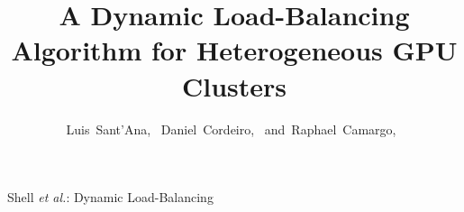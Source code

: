 \documentclass[journal]{IEEEtran}
\begin{document}
%
\title{A Dynamic Load-Balancing Algorithm for Heterogeneous GPU Clusters}
%
%
%

\author{Luis~Sant'Ana,~
        Daniel~Cordeiro,~
        and~Raphael~Camargo,~}%

% 
%



%
{Shell \MakeLowercase{\textit{et al.}}:  Dynamic Load-Balancing}
% 
\end{document}
